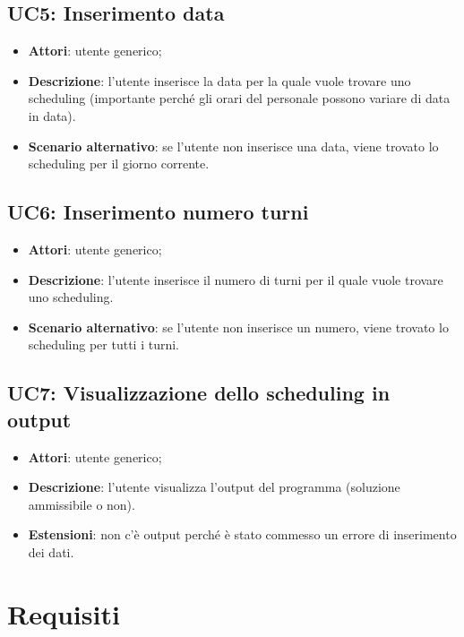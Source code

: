 \subsection{UC5: Inserimento data}
\label{UC5}
\begin{itemize}
    \item \textbf{Attori}: utente generico;
    \item \textbf{Descrizione}: l'utente inserisce la data per la quale vuole trovare uno scheduling (importante perché gli orari del personale possono variare di data in data).
    \item \textbf{Scenario alternativo}: se l'utente non inserisce una data, viene trovato lo scheduling per il giorno corrente.
\end{itemize}

\subsection{UC6: Inserimento numero turni}
\label{UC6}
\begin{itemize}
    \item \textbf{Attori}: utente generico;
    \item \textbf{Descrizione}: l'utente inserisce il numero di turni per il quale vuole trovare uno scheduling.
    \item \textbf{Scenario alternativo}: se l'utente non inserisce un numero, viene trovato lo scheduling per tutti i turni.
\end{itemize}

\subsection{UC7: Visualizzazione dello scheduling in output}
\label{UC7}
\begin{itemize}
    \item \textbf{Attori}: utente generico;
    \item \textbf{Descrizione}: l'utente visualizza l'output del programma (soluzione ammissibile o non).
    \item \textbf{Estensioni}: non c'è output perché è stato commesso un errore di inserimento dei dati.
\end{itemize}
\clearpage
\section{Requisiti}

